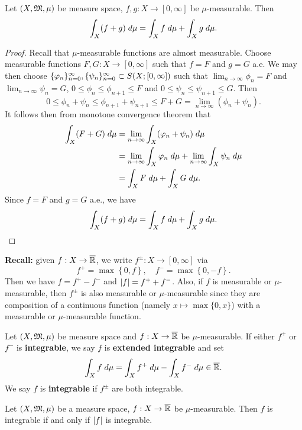 \documentclass[a4paper]{article}
\begin{document}
\begin{thm}
Let $(X, \mathfrak{M}, \mu)$ be measure space, $f, g : X \to [0, \infty]$
be $\mu$-measurable. Then 
\[
\int_X (f + g) \; d \mu = \int_X f \; d \mu + \int_X g \; d \mu.
\]
\end{thm}

\begin{proof}
Recall that $\mu$-measurable functions are almost 
measurable. Choose measurable functions 
$F, G : X \to [0, \infty]$ such that $f = F$
and $g = G$ a.e. We may then choose 
$\{ \varphi_n \}_{n=0}^\infty, \{ \psi_n \}_{n=0}^\infty \subset S(X; [0, \infty])$
such that $\lim_{n \to \infty} \phi_n = F$
and $\lim_{n \to \infty} \psi_n = G$, 
$0 \leq \phi_n \leq \phi_{n+1} \leq F$
and $0 \leq \psi_n \leq \psi_{n+1} \leq G$. 
Then 
\[
0 \leq \phi_n + \psi_n \leq \phi_{n+1} + \psi_{n+1} 
\leq F + G = \lim_{n \to \infty} (\phi_n + \psi_n).
\]
It follows then from monotone convergence theorem that 
\[
\begin{aligned}
\int_X (F + G) \; d \mu 
&= \lim_{n \to \infty} \int_X (\varphi_n + \psi_n) \; d \mu \\
&= \lim_{n \to \infty} \int_X \varphi_n \; d \mu 
+ \lim_{n \to \infty} \int_X \psi_n \; d \mu \\ 
&= \int_X F \; d \mu + \int_X G \; d \mu.
\end{aligned}
\]
Since $f = F$ and $g = G$ a.e., we have 
\[
\int_X (f + g) \; d \mu = \int_X f \; d \mu + \int_X g \; d \mu.
\]
\end{proof}

\textbf{Recall:} given $f: X \to \overline{\mathbb{R}}$, 
we write $f^{\pm} : X \to [0, \infty]$ via 
\[
f^+ = \max\left\{ 0, f \right\}, \quad 
f^- = \max\left\{ 0, -f \right\}.
\]
Then we have $f = f^+ - f^-$ and 
$\left\lvert f\right\rvert = f^+ + f^-$. Also, if $f$ is measurable or 
$\mu$-measurable, then $f^\pm$ is also measurable or
$\mu$-measurable since they are composition of a 
continuous function (namely $x \mapsto \max \{0, x\}$)
with a measurable or $\mu$-measurable
function.

\begin{defi}
Let $(X, \mathfrak{M}, \mu)$ be measure space and 
$f : X \to \overline{\mathbb{R}}$ be $\mu$-measurable. 
If either $f^+$ or $f^-$ is \textbf{integrable}, 
we say $f$ is \textbf{extended integrable} and 
set 
\[
\int_X f \; d \mu = \int_X f^+ \; d \mu - \int_X f^- \; d \mu
\in \overline{\mathbb{R}}.
\]
We say $f$ is \textbf{integrable} if $f^\pm$ are both 
integrable.
\end{defi}

\begin{prop}
Let $(X, \mathfrak{M}, \mu)$ be a measure space, $f : X \to \overline{\mathbb{R}}$
be $\mu$-measurable. Then $f$ is integrable 
if and only if $\left\lvert f\right\rvert$ is integrable.
\end{prop}
\end{document}
